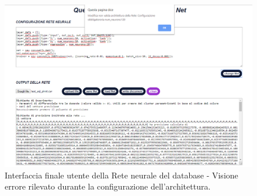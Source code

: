 \begin{figure}[H]
\centering
	\includegraphics[width=1\linewidth]{./image/Rete-di-prova_db3.png}
	\caption{Interfaccia finale utente della Rete neurale del database - Visione errore rilevato durante la configurazione dell'architettura.}
	\label{Interfaccia finale utente della Rete neurale del database -3.}
\end{figure}
\noindent
